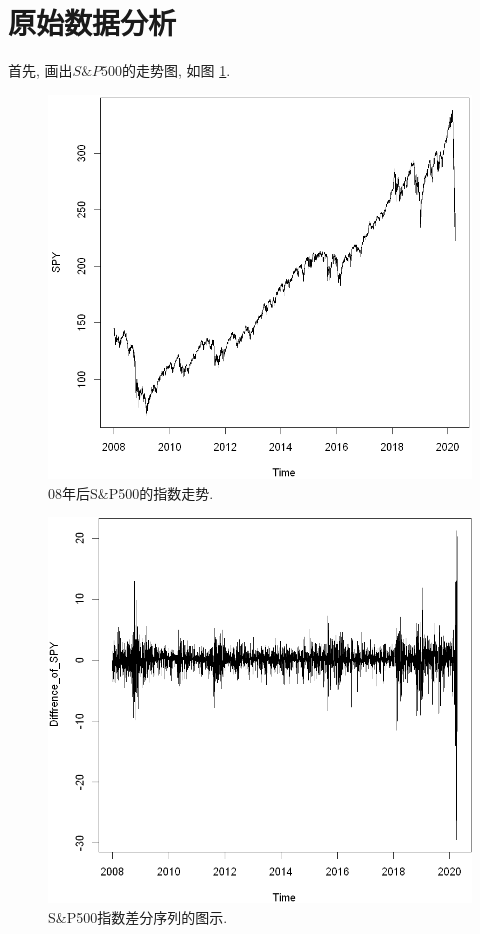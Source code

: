 \documentclass[11pt]{article}
\begin{document}
\section{原始数据分析}
\qquad 首先, 画出$S\&P500$的走势图, 如图 \ref{fig:1}.
\begin{center}
    \hspace{30pt}\begin{minipage}{0.45\textwidth}
        \begin{figure}
            \centering
            \hspace{-30pt}\includegraphics[width=.9\textwidth]{output_3_0}
            \caption{08年后S\&P500的指数走势.\label{fig:1}}
        \end{figure}
    \end{minipage}
    \begin{minipage}{0.45\textwidth}
        \begin{figure}
            \centering
            \hspace{-25pt}\includegraphics[width=.9\textwidth]{output_4_0}
            \caption{S\&P500指数差分序列的图示.\label{fig:2}}
        \end{figure}
    \end{minipage}
\end{center}
\end{document}

